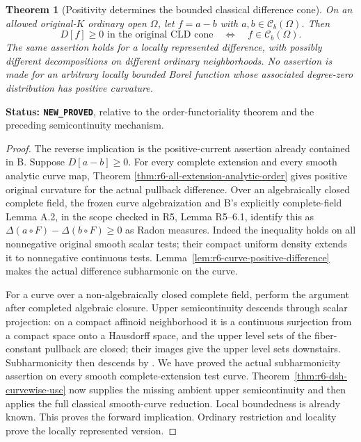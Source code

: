\documentclass[11pt,a4paper]{article}
\numberwithin{equation}{section}
\newtheorem{theorem}{Theorem}[section]
\theoremstyle{definition}
\theoremstyle{remark}
\begin{document}
\begin{theorem}[Positivity determines the bounded classical difference cone]
\label{thm:r6-positive-bounded-dsh-classical}
On an allowed original-$K$ ordinary open $\Omega$, let
$f=a-b$ with $a,b\in\mathcal C_b(\Omega)$. Then
\[
             D[f]\ge0\text{ in the original CLD cone}
                         \quad\Longleftrightarrow\quad
             f\in\mathcal C_b(\Omega).
\]
The same assertion holds for a locally represented difference, with
possibly different decompositions on different ordinary neighborhoods.
No assertion is made for an arbitrary locally bounded Borel function
whose associated degree-zero distribution has positive curvature.
\end{theorem}

\noindent\textbf{Status: \texttt{NEW\_PROVED}}, relative to the
order-functoriality theorem and the preceding semicontinuity mechanism.

\begin{proof}
The reverse implication is the positive-current assertion already
contained in B. Suppose $D[a-b]\ge0$. For every complete extension
and every smooth analytic curve map, Theorem
\ref{thm:r6-all-extension-analytic-order} gives positive original
curvature for the actual pullback difference. Over an algebraically
closed complete field, the frozen curve algebraization and B's explicitly complete-field
Lemma A.2, in the scope checked in R5, Lemma
\textup{R5--6.1}, identify this as
$\Delta(a\circ F)-\Delta(b\circ F)\ge0$ as Radon measures.
Indeed the inequality holds on all nonnegative original smooth scalar
tests; their compact uniform density extends it to nonnegative
continuous tests. Lemma~\ref{lem:r6-curve-positive-difference} makes
the actual difference subharmonic on the curve.

For a curve over a non-algebraically closed complete field, perform
the argument after completed algebraic closure. Upper semicontinuity
descends through scalar projection: on a compact affinoid neighborhood
it is a continuous surjection from a compact space onto a Hausdorff
space, and the upper level sets of the fiber-constant pullback are
closed; their images give the upper level sets downstairs. Subharmonicity
then descends by \cite[Proposition 3.5(7)]{GR25}. We have proved the
actual subharmonicity assertion on every smooth complete-extension
test curve. Theorem~\ref{thm:r6-dsh-curvewise-usc} now supplies the
missing ambient upper semicontinuity and then applies the full
classical smooth-curve reduction. Local boundedness is already known.
This proves the forward implication. Ordinary restriction and locality prove the
locally represented version.
\end{proof}
\end{document}
